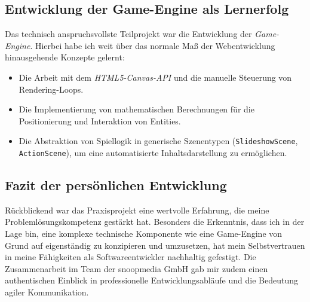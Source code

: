 \subsection{Entwicklung der Game-Engine als Lernerfolg}
Das technisch anspruchsvollste Teilprojekt war die Entwicklung der \textit{Game-Engine}. Hierbei habe ich weit über das normale Maß der Webentwicklung hinausgehende Konzepte gelernt:
\begin{itemize}
    \item Die Arbeit mit dem \textit{HTML5-Canvas-API} und die manuelle Steuerung von Rendering-Loops.
    \item Die Implementierung von mathematischen Berechnungen für die Positionierung und Interaktion von Entities.
    \item Die Abstraktion von Spiellogik in generische Szenentypen (\texttt{Slideshow\-Scene}, \texttt{Action\-Scene}), um eine automatisierte Inhaltsdarstellung zu ermöglichen.
\end{itemize}

\subsection{Fazit der persönlichen Entwicklung}
Rückblickend war das Praxisprojekt eine wertvolle Erfahrung, die meine Problemlösungskompetenz gestärkt hat. Besonders die Erkenntnis, dass ich in der Lage bin, eine komplexe technische 
Komponente wie eine Game-Engine von Grund auf eigenständig zu konzipieren und umzusetzen, hat mein Selbstvertrauen in meine Fähigkeiten als Softwareentwickler nachhaltig gefestigt. Die 
Zusammenarbeit im Team der snoopmedia GmbH gab mir zudem einen authentischen Einblick in professionelle Entwicklungsabläufe und die Bedeutung agiler Kommunikation.